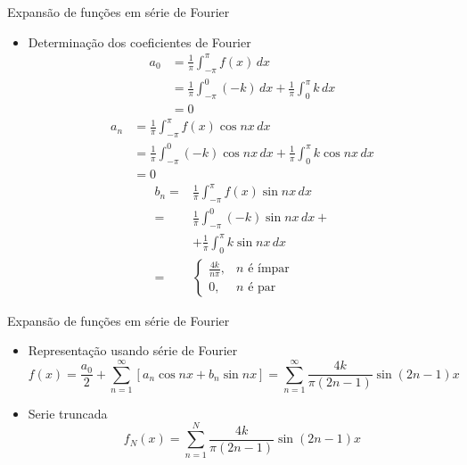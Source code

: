       \begin{slide}[toc=]{Expansão de funções em série de Fourier}
	      \begin{itemize}
		      \item Determinação dos coeficientes de Fourier 
			      \twocolumn
			      {
				      \begin{align*}
					      a_0 &= \frac{1}{\pi}\int_{-\pi}^\pi f(x)\, dx\\
					      	  &= \frac{1}{\pi}\int_{-\pi}^0 (-k)\, dx + \frac{1}{\pi}\int_{0}^\pi k\, dx\\
						  &= 0
				      \end{align*}
				      \begin{align*}
					      a_n &= \frac{1}{\pi}\int_{-\pi}^\pi f(x)\cos nx\, dx\\
					      	  &= \frac{1}{\pi}\int_{-\pi}^0 (-k)\cos nx\, dx + \frac{1}{\pi}\int_{0}^\pi k\cos nx\, dx\\
						  &= 0
				      \end{align*}
			      }{
				      \begin{align*}
					      b_n =& \frac{1}{\pi}\int_{-\pi}^\pi f(x)\sin nx\, dx\\
					          =& \frac{1}{\pi}\int_{-\pi}^0 (-k)\sin nx\, dx + \\ 
						  &+\frac{1}{\pi}\int_{0}^\pi k\sin nx\, dx\\
						  =&\begin{cases}
							  \frac{4k}{n\pi}, & n\text{ é ímpar}\\
							  0, & n\text{ é par}
						  \end{cases}
				      \end{align*}
				}
	      \end{itemize}
      \end{slide}

      \begin{slide}[toc=]{Expansão de funções em série de Fourier}
	      \begin{itemize}
		      \item Representação usando série de Fourier
			      \begin{equation*}
				      f(x) = \frac{a_0}{2}+ \sum_{n=1}^\infty \left [ a_n\cos nx  + b_n\sin nx \right ]
					   =\sum_{n=1}^\infty \frac{4k}{\pi(2n-1)}\sin(2n-1)x
			      \end{equation*}
		      \item Serie truncada
			      \begin{equation*}
				      f_N(x)=\sum_{n=1}^N \frac{4k}{\pi(2n-1)}\sin(2n-1)x
			      \end{equation*}
	      \end{itemize}
      \end{slide}

